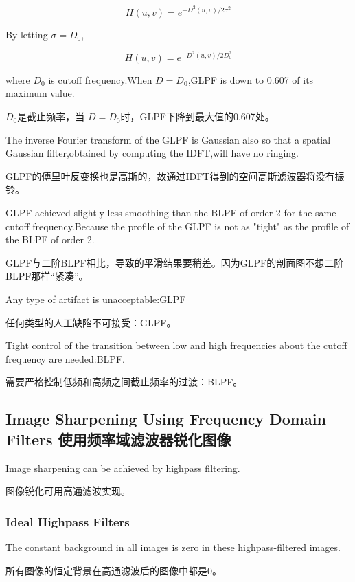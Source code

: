 \documentclass[12pt]{article}
\numberwithin{equation}{section}%
\begin{document}
\begin{equation} \label{4.49}
H(u,v)=e^{-D^{2}(u,v)/2\sigma^{2}}
\end{equation} 

By letting $\sigma=D_{0}$,

\begin{equation} \label{4.50}
H(u,v)=e^{-D^{2}(u,v)/2D_{0}^{2}}
\end{equation} 

where $D_{0}$ is cutoff frequency.When $D=D_{0}$,GLPF is down to 0.607 of its maximum value.

$D_{0}$是截止频率，当 $D=D_{0}$时，GLPF下降到最大值的0.607处。

The inverse Fourier transform of the GLPF is Gaussian also so that a spatial Gaussian filter,obtained by computing the IDFT,will have no ringing.

GLPF的傅里叶反变换也是高斯的，故通过IDFT得到的空间高斯滤波器将没有振铃。

GLPF achieved slightly less smoothing than the BLPF of order 2 for the same cutoff frequency.Because the profile of the GLPF is not as "tight" as the profile of the BLPF of order 2.

GLPF与二阶BLPF相比，导致的平滑结果要稍差。因为GLPF的剖面图不想二阶BLPF那样``紧凑''。

Any type of artifact is unacceptable:GLPF

任何类型的人工缺陷不可接受：GLPF。

Tight control of the transition between low and high frequencies about the cutoff frequency are needed:BLPF.

需要严格控制低频和高频之间截止频率的过渡：BLPF。

\subsection{Image Sharpening Using Frequency Domain Filters 使用频率域滤波器锐化图像} 

Image sharpening can be achieved by highpass filtering.

图像锐化可用高通滤波实现。

\subsubsection{Ideal Highpass Filters}

The constant background in all images is zero in these highpass-filtered images.

所有图像的恒定背景在高通滤波后的图像中都是0。
\end{document}
